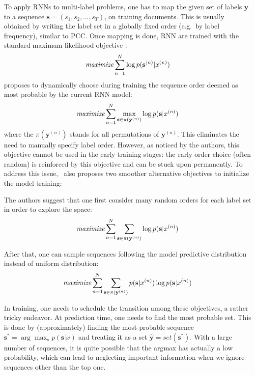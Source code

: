  
 To apply RNNs to multi-label problems, one has to map the given set of labels $\mathbf{y}$ to a sequence $\mathbf{s}=(s_1,s_2,...,s_T)$, on training documents. This is usually obtained by writing the label set in a globally fixed order (e.g.\ by label frequency), similar to PCC.
 Once mapping is done, RNN are trained with the standard maximum likelihood objective \cite{DBLP:conf/nips/NamMKF17}: 
\begin{align}
\textit{maximize} \sum_{n=1}^N \log p(\mathbf{s}^{(n)}|x^{(n)})\\
\label{eq:standard_rnn}
\end{align}
 proposes to dynamically choose during training the sequence order deemed as most probable by the current RNN model:
\begin{align}
\textit{maximize} \sum_{n=1}^N \max_{\mathbf{s}\in \pi(\mathbf{y}^{(n)})}\log p(\mathbf{s}|x^{(n)})
\label{eq:max_obj}
\end{align}
where the $\pi(\mathbf{y}^{(n)})$ stands for all  permutations of $\mathbf{y}^{(n)}$. This eliminates the need to manually specify label order.
However, as noticed by the authors, this objective cannot be used in the early training stages: the early order choice (often random) is reinforced by this objective and can be stuck upon permanently. To address this issue, ~also proposes two smoother alternative objectives to initialize the model training:

The authors suggest that one first consider many random orders for each label set in order to explore the space:
\begin{align}
\textit{maximize} \sum_{n=1}^N \sum_{\mathbf{s}\in \pi(\mathbf{y}^{(n)})}\log p(\mathbf{s}|x^{(n)})
\label{eq:wrong_obj}
\end{align} 

After that, one can sample sequences following the model predictive distribution instead of uniform distribution:
\begin{align}
\textit{maximize} \sum_{n=1}^N \sum_{\mathbf{s}\in \pi(\mathbf{y}^{(n)})}p(\mathbf{s}|x^{(n)})\log p(\mathbf{s}|x^{(n)})
\label{eq:sample_obj}
\end{align}  

In training, one needs to  schedule the transition among these objectives, a rather tricky endeavor. At prediction time, one needs to find the most probable set. This is done by (approximately) finding the most probable sequence $\mathbf{s}^*=\arg\max_\mathbf{s} p(\mathbf{s}|x)$ and treating it as a set $\hat{\mathbf{y}}=set(\mathbf{s}^*)$. With a large number of sequences, it is quite possible that the argmax has actually a low probability, which can lead to neglecting important information when we ignore sequences other than the top one. 




